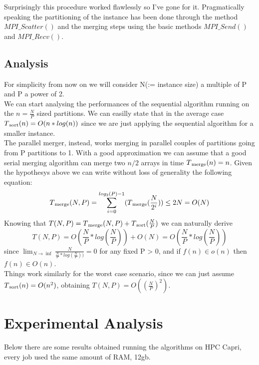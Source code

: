 \documentclass{article}
\begin{document}
Surprisingly this procedure worked flawlessly so I've gone for it. Pragmatically speaking the partitioning of 
the instance has been done through the method $MPI\_Scatter()$ and the merging steps using the basic
methods $MPI\_Send()$ and $MPI\_Recv()$.

\subsection*{Analysis}
For simplicity from now on we will consider N(:= instance size) a multiple of P 
and P a power of 2.\\
We can start analysing the performances of the sequential algorithm running on the 
$n = \frac{N}{P}$ sized partitions. We can easilly state that in the average case
$T\textsubscript{sort}(n) = O(n*log(n))$ since we are just applying the sequential algorithm for a 
smaller instance.\\ 
The parallel merger, instead, works merging in parallel couples of partitions going from P partitions to 1. 
With a good approximation we can assume that a good serial merging algorithm can merge two $n/2$ arrays in time 
$T\textsubscript{merge}(n) = n$.  
Given the hypothesys above we can write without loss of generality the following equation:
\begin{equation}
T\textsubscript{merge}(N,P) =\sum_{i=0}^{log_2(P)-1}(T\textsubscript{merge}(\frac{N}{2^i})) \le 2N = O(N) 
\end{equation}
Knowing that $T(N,P) = T\textsubscript{merge}(N,P) + T\textsubscript{sort}(\frac{N}{P})$ we can naturally derive
\begin{equation}
T(N,P) = O(\frac{N}{P}*log(\frac{N}{P})) + O(N) = O(\frac{N}{P}*log(\frac{N}{P}))
\end{equation}
since $\lim_{N \to \inf}\frac{N}{\frac{N}{P}*log(\frac{N}{P}))} = 0$ for any fixed P > 0, and if $f(n) \in o(n)$ then $f(n) \in O(n)$.\\
Things work similarly for the worst case scenario, since we can just assume $T\textsubscript{sort}(n) = O(n^2)$, obtaining 
$T(N,P) = O((\frac{N}{P})^2)$.
\pagebreak
\section{Experimental Analysis}
Below there are some results obtained running the algorithms on HPC Capri, every 
job used the same amount of RAM, 12gb.\\
\end{document}
